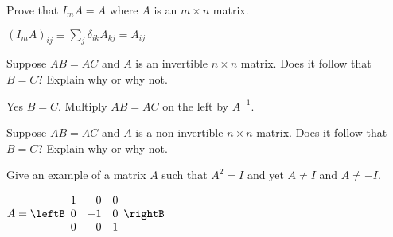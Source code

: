 \begin{enumialphparenastyle}

\begin{ex} Prove that $I_{m}A=A$ where $A$ is an $m\times n$ matrix.
\begin{sol}
 $\left(
I_{m}A\right) _{ij}\equiv \sum_{j}\delta _{ik}A_{kj}=A_{ij}$
\end{sol}
\end{ex}

\begin{ex} Suppose $AB=AC$ and $A$ is an invertible $n\times n$ matrix. Does it
follow that $B=C?$ Explain why or why not. 
\begin{sol}
Yes $B=C$. Multiply $AB = AC$ on the left by $A^{-1}$. 
\end{sol}
\end{ex}

\begin{ex} Suppose $AB=AC$ and $A$ is a non invertible $n\times n$ matrix. Does it follow that $B=C$? Explain why or why not.  
\end{ex}

\begin{ex} Give an example of a matrix $A$ such that $A^{2}=I$ and yet $A\neq I$
and $A\neq -I.$ 
\begin{sol}
$A = \leftB
\begin{array}{rrr}
1 & 0 & 0 \\
0 & -1 & 0 \\
0 & 0 & 1
\end{array}
\rightB $
\end{sol}
\end{ex}

\end{enumialphparenastyle}